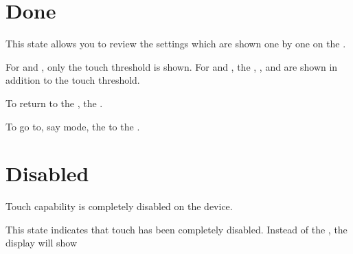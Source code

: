 

\section{Done} 

This state allows you to review the settings which are shown one by one on
the .

\par\medskip

For  and , only the touch threshold is shown.  For 
and , the , ,  and  are shown in
addition to the touch threshold.

\par\medskip

To return to the ,  the .


To go to, say  mode,  the  to the .


\section{Disabled} 

Touch capability is completely disabled on the device.

\par\medskip

This state indicates that touch has been completely disabled.  Instead of the
, the display will show

\begin{figure}[H]
\centering
\end{figure}

